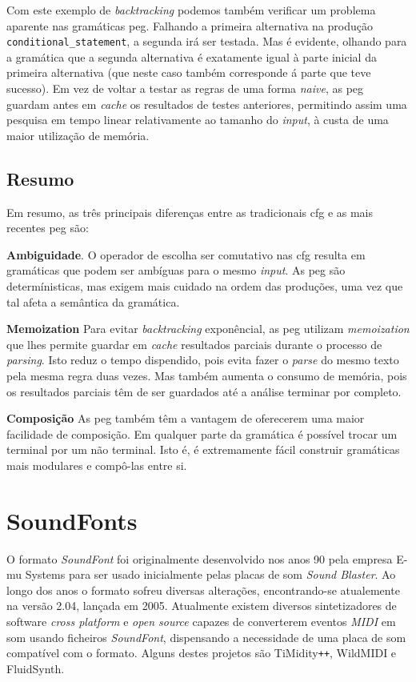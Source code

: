 \documentclass[
  oneside,
  11pt, a4paper,
  footinclude=true,
  headinclude=true,
  cleardoublepage=empty
]{scrbook}
\begin{document}
Com este exemplo de \textit{backtracking} podemos também verificar um problema aparente nas gramáticas \acrshort{peg}. Falhando a primeira alternativa na produção \texttt{conditional\_statement}, a segunda irá ser testada. Mas é evidente, olhando para a gramática que a segunda alternativa é exatamente igual à parte inicial da primeira alternativa (que neste caso também corresponde á parte que teve sucesso). Em vez de voltar a testar as regras de uma forma \textit{naive}, as \acrlong{peg} guardam antes em \textit{cache} os resultados de testes anteriores, permitindo assim uma pesquisa em tempo linear relativamente ao tamanho do \textit{input}, à custa de uma maior utilização de memória.


\subsection{Resumo}
Em resumo, as três principais diferenças entre as tradicionais \acrfull{cfg} e as mais recentes \acrfull{peg} são:

\textbf{Ambiguidade}. O operador de escolha ser comutativo nas \acrshort{cfg} resulta em gramáticas que podem ser ambíguas para o mesmo \textit{input}. As \acrshort{peg} são determínisticas, mas exigem mais cuidado na ordem das produções, uma vez que tal afeta a semântica da gramática.

\textbf{Memoization} Para evitar \textit{backtracking} exponêncial, as \acrshort{peg} utilizam \textit{memoization} que lhes permite guardar em \textit{cache} resultados parciais durante o processo de \textit{parsing}. Isto reduz o tempo dispendido, pois evita fazer o \textit{parse} do mesmo texto pela mesma regra duas vezes. Mas também aumenta o consumo de memória, pois os resultados parciais têm de ser guardados até a análise terminar por completo.

\textbf{Composição} As \acrlong{peg} também têm a vantagem de oferecerem uma maior facilidade de composição. Em qualquer parte da gramática é possível trocar um terminal por um não terminal. Isto é, é extremamente fácil construir gramáticas mais modulares e compô-las entre si.

    \section{SoundFonts}
    O formato \textit{SoundFont} foi originalmente desenvolvido nos anos 90 pela empresa E-mu Systems para ser usado inicialmente pelas placas de som \textit{Sound Blaster}. Ao longo dos anos o formato sofreu diversas alterações, encontrando-se atualemente na versão 2.04, lançada em 2005\cite{soundfont}. Atualmente existem diversos sintetizadores de software \textit{cross platform} e \textit{open source} capazes de converterem eventos \textit{MIDI} em som usando ficheiros \textit{SoundFont}, dispensando a necessidade de uma placa de som compatível com o formato. Alguns destes projetos são TiMidity\verb|++|\cite{timidity}, WildMIDI\cite{wild-midi} e FluidSynth\cite{fluidsynth}.
    
\end{document}

